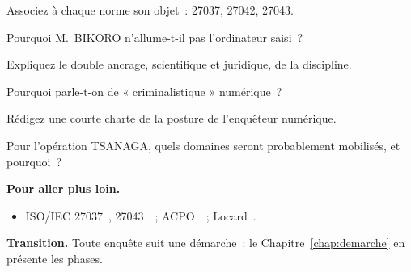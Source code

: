 \begin{boxexo}[title={\ding{45}\quad Exercice~1.5. Référentiels \niveaumoyen}]
Associez à chaque norme son objet~: 27037, 27042, 27043.
\end{boxexo}

\begin{boxexo}[title={\ding{45}\quad Exercice~1.6. TSANAGA \niveaumoyen}]
Pourquoi M.~BIKORO n'allume-t-il pas l'ordinateur saisi~?
\end{boxexo}

\begin{boxexo}[title={\ding{45}\quad Exercice~1.7. Double ancrage \niveaumoyen}]
Expliquez le double ancrage, scientifique et juridique, de la discipline.
\end{boxexo}

\begin{boxexo}[title={\ding{45}\quad Exercice~1.8. Criminalistique \niveaumoyen}]
Pourquoi parle-t-on de « criminalistique » numérique~?
\end{boxexo}

\begin{boxexo}[title={\ding{45}\quad Exercice~1.9. Posture \niveauexpert}]
Rédigez une courte charte de la posture de l'enquêteur numérique.
\end{boxexo}

\begin{boxexo}[title={\ding{45}\quad Exercice~1.10. Panorama \niveauexpert}]
Pour l'opération TSANAGA, quels domaines seront probablement mobilisés, et
pourquoi~?
\end{boxexo}

\bigskip

\begin{boxinfo}
\textbf{Pour aller plus loin.}
\begin{itemize}
    \item ISO/IEC 27037~\cite{iso27037}, 27043~\cite{iso27043}~;
          ACPO~\cite{acpo2012}~; Locard~\cite{locard1920}.
\end{itemize}
\end{boxinfo}

\begin{boxinfo}
\textbf{Transition.} Toute enquête suit une démarche~: le
Chapitre~\ref{chap:demarche} en présente les phases.
\end{boxinfo}
